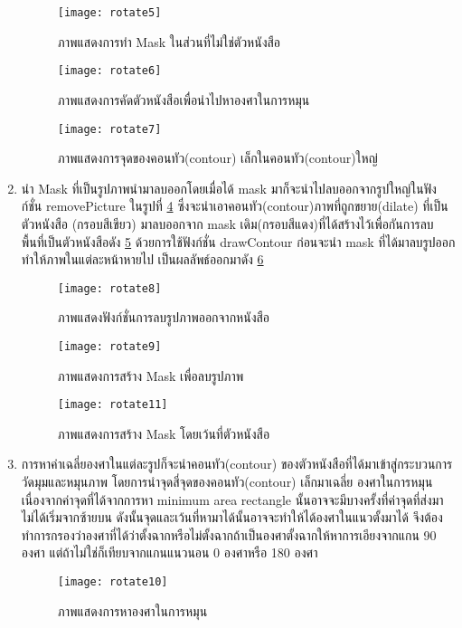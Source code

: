 \begin{enumerate}
    \begin{figure}[H]
        \centering
        \texttt{[image: rotate5]}
        \caption{ภาพแสดงการทำ Mask ในส่วนที่ไม่ใช่ตัวหนังสือ}\label{fig:rotate5}
    \end{figure}

    \begin{figure}[H]
        \centering
        \texttt{[image: rotate6]}
        \caption{ภาพแสดงการคัดตัวหนังสือเพื่อนำไปหาองศาในการหมุน}\label{fig:rotate6}
    \end{figure}

    \begin{figure}[H]
        \centering
        \texttt{[image: rotate7]}
        \caption{ภาพแสดงการจุดของคอนทัว(contour) เล็กในคอนทัว(contour)ใหญ่}\label{fig:rotate7}
    \end{figure}

    \item นำ Mask ที่เป็นรูปภาพนำมาลบออกโดยเมื่อได้ mask มาก็จะนำไปลบออกจากรูปใหญ่ในฟังก์ชั่น removePicture ในรูปที่ \ref{fig:rotate8}  ซึ่งจะนำเอาคอนทัว(contour)ภาพที่ถูกขยาย(dilate) ที่เป็นตัวหนังสือ (กรอบสีเขียว) มาลบออกจาก mask เดิม(กรอบสีแดง)ที่ได้สร้างไว้เพื่อกันการลบพื้นที่เป็นตัวหนังสือดัง \ref{fig:rotate9} ด้วยการใช้ฟังก์ชั่น drawContour ก่อนจะนำ mask ที่ได้มาลบรูปออกทำให้ภาพในแต่ละหน้าหายไป เป็นผลลัพธ์ออกมาดัง \ref{fig:rotate11}
    
    \begin{figure}[H]
        \centering
        \texttt{[image: rotate8]}
        \caption{ภาพแสดงฟังก์ชั่นการลบรูปภาพออกจากหนังสือ}\label{fig:rotate8}
    \end{figure}

    \begin{figure}[H]
        \centering
        \texttt{[image: rotate9]}
        \caption{ภาพแสดงการสร้าง Mask เพื่อลบรูปภาพ}\label{fig:rotate9}
    \end{figure}

    \begin{figure}[H]
        \centering
        \texttt{[image: rotate11]}
        \caption{ภาพแสดงการสร้าง Mask โดยเว้นที่ตัวหนังสือ}\label{fig:rotate11}
    \end{figure}

    \item การหาค่าเฉลี่ยองศาในแต่ละรูปก็จะนำคอนทัว(contour) ของตัวหนังสือที่ได้มาเข้าสู่กระบวนการวัดมุมและหมุนภาพ โดยการนำจุดสี่จุดของคอนทัว(contour) เล็กมาเฉลี่ย องศาในการหมุน เนื่องจากค่าจุดที่ได้จากการหา minimum area rectangle นั้นอาจจะมีบางครั้งที่ค่าจุดที่ส่งมาไม่ได้เริ่มจากซ้ายบน ดังนั้นจุดและเว้นที่หามาได้นั้นอาจจะทำให้ได้องศาในแนวตั้งมาได้ จึงต้องทำการกรองว่าองศาที่ได้ว่าตั้งฉากหรือไม่ตั้งฉากถ้าเป็นองศาตั้งฉากให้หาการเอียงจากแกน 90 องศา แต่ถ้าไม่ใช่ก็เทียบจากแกนแนวนอน 0 องศาหรือ 180 องศา

    \begin{figure}[H]
        \centering
        \texttt{[image: rotate10]}
        \caption{ภาพแสดงการหาองศาในการหมุน}\label{fig:rotate10}
    \end{figure}
    
\end{enumerate}

